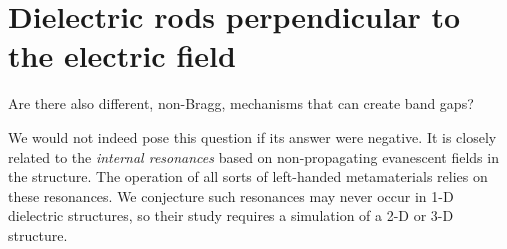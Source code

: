 \documentclass[letterpaper,12pt]{report}
\begin{document}
\section{Dielectric rods perpendicular to the electric field}
Are there also different, non-Bragg, mechanisms that can create band gaps?

We would not indeed pose this question if its answer were negative. It is closely related to the \textit{internal resonances} based on non-propagating evanescent fields in the structure. The operation of all sorts of left-handed metamaterials  relies on these resonances. We conjecture such resonances may never occur in 1-D dielectric structures, so their study requires a simulation of a 2-D or 3-D structure.
\end{document}
